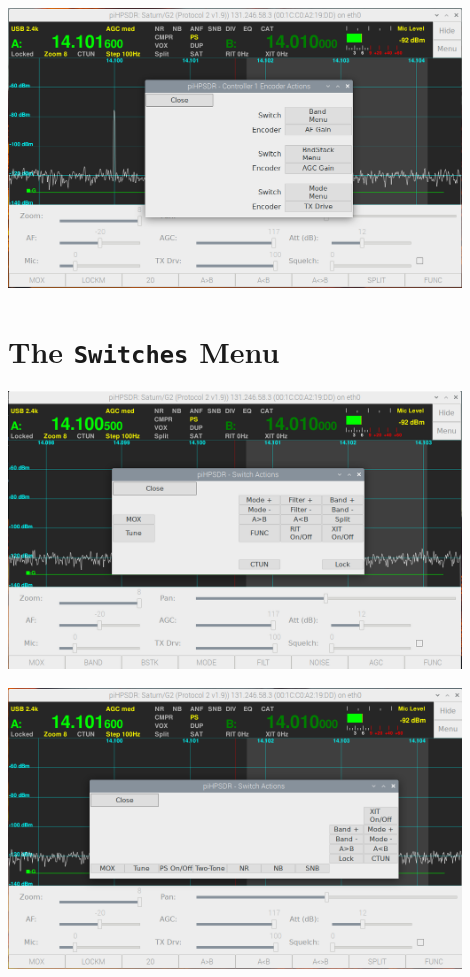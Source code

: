 \documentclass[12pt]{book}
\begin{document}
\begin{center}
\includegraphics[width=12cm]{EncoderMenuV1.png}
\end{center}


\section{The \texttt{Switches} Menu}
\begin{center}
\includegraphics[width=12cm]{SwitchMenuG2.png}
\end{center}

\begin{center}
\includegraphics[width=12cm]{SwitchMenuV2.png}
\end{center}
\end{document}

